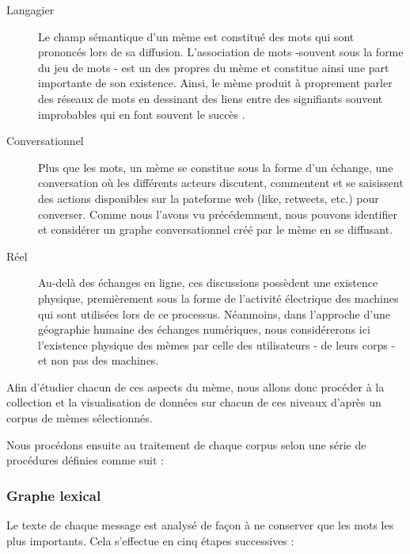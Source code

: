 \begin{description}
\item[Langagier] Le champ sémantique d{\textquoteright}un mème est constitué des mots qui sont prononcés lors de sa diffusion. L{\textquoteright}association de mots -souvent sous la forme du jeu de mots - est un des propres du mème et constitue ainsi une part importante de son existence. Ainsi, le mème produit à proprement parler des réseaux de mots en dessinant des liens entre des signifiants souvent improbables qui en font souvent le succès \citep{Bauckhage2011}. 

\item[Conversationnel] Plus que les mots, un mème se constitue sous la forme d{\textquoteright}un échange, une conversation o\`u les différents acteurs discutent, commentent et se saisissent des actions disponibles sur la pateforme web (like, retweets, etc.) pour converser. Comme nous l{\textquoteright}avons vu précédemment, nous pouvons identifier et considérer un graphe conversationnel créé par le mème en se diffusant. 

\item[Réel] Au-delà des échanges en ligne, ces discussions possèdent une existence physique, premièrement sous la forme de l{\textquoteright}activité électrique des machines qui sont utilisées lors de ce processus. Néanmoins, dans l{\textquoteright}approche d{\textquoteright}une géographie humaine des échanges numériques, nous considérerons ici l{\textquoteright}existence physique des mèmes par celle des utilisateurs - de leurs corps - et non pas des machines. 
\end{description}


Afin d{\textquoteright}étudier chacun de ces aspects du mème, nous allons donc procéder à la collection et la visualisation de données sur chacun de ces niveaux d{\textquoteright}après un corpus de mèmes sélectionnés. 


Nous procédons ensuite au traitement de chaque corpus selon une
série de procédures définies comme suit :

\subsubsection{Graphe lexical}

Le texte de chaque message est analysé de fa\c{c}on à ne conserver
que les mots les plus importants. Cela s{\textquoteright}effectue en
cinq étapes successives : 


